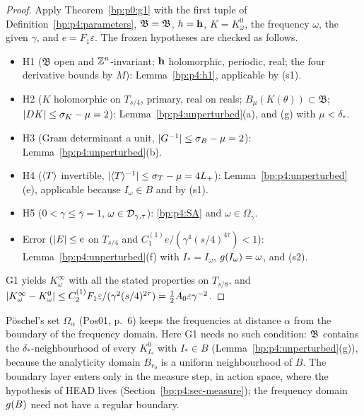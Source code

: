 \begin{proof}
\label{step:p4:apply-g1}
Apply Theorem~\ref{bp:p0:g1} with the first tuple of Definition~\ref{bp:p4:parameters},
$\mathfrak B=\mathfrak{B}$, $h=\mathbf{h}$, $K=K^0_\omega$, the frequency $\omega$, the given $\gamma$, and
$e=F_1\varepsilon$. The frozen hypotheses are checked as follows.
\begin{itemize}
\item H1 ($\mathfrak B$ open and $\mathbb{Z}^n$-invariant; $\mathbf{h}$ holomorphic, periodic, real; the four
  derivative bounds by $M$): Lemma~\ref{bp:p4:h1}, applicable by (s1).
\item H2 ($K$ holomorphic on $T_{s/4}$, primary, real on reals; $B_\mu(K(\theta))\subset\mathfrak B$;
  $\lvert DK\rvert\le\sigma_K-\mu=2$): Lemma~\ref{bp:p4:unperturbed}(a), and (g) with $\mu<\delta_*$.
\item H3 (Gram determinant a unit, $\lvert G^{-1}\rvert\le\sigma_B-\mu=2$): Lemma~\ref{bp:p4:unperturbed}(b).
\item H4 ($\langle T\rangle$ invertible, $\lvert \langle T\rangle^{-1}\rvert\le\sigma_T-\mu=4L_{+}$): Lemma~\ref{bp:p4:unperturbed}(e),
  applicable because $I_\omega\in B$ and by (s1).
\item H5 ($0<\gamma\le\bar\gamma=1$, $\omega\in\mathcal{D}_{\gamma,\tau}$): \eqref{bp:p4:SA} and
  $\omega\in\Omega_\gamma$.
\item Error ($\lvert E\rvert\le e$ on $T_{s/4}$ and $C_1^{(1)}e/(\gamma^4(s/4)^{4\tau})<1$):
  Lemma~\ref{bp:p4:unperturbed}(f) with $I_*=I_\omega$, $g(I_\omega)=\omega$, and (s2).
\end{itemize}
G1 yields $K^\infty_\omega$ with all the stated properties on $T_{s/8}$, and
$\lvert K^\infty_\omega-K^0_\omega\rvert\le C_2^{(1)}F_1\varepsilon/(\gamma^2(s/4)^{2\tau})=\frac12A_0\varepsilon\gamma^{-2}$.
\end{proof}

\begin{remark}\label{bp:p4:omega-gamma}
Pöschel's set $\Omega_\alpha$ (Pos01, p.~6) keeps the frequencies at distance $\alpha$ from the
boundary of the frequency domain. Here G1 needs no such condition: $\mathfrak{B}$ contains the
$\delta_*$-neighbourhood of every $K^0_{I_*}$ with $I_*\in B$ (Lemma~\ref{bp:p4:unperturbed}(g)),
because the analyticity domain $B_{r_0}$ is a uniform neighbourhood of $B$. The boundary layer
enters only in the measure step, in action space, where the hypothesis of HEAD lives
(Section~\ref{bp:p4:sec-measure}); the frequency domain $g(B)$ need not have a regular boundary.
\end{remark}

